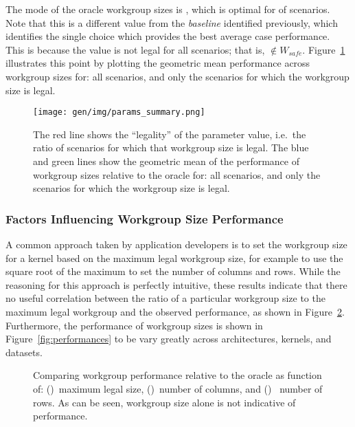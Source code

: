 The mode of the oracle workgroup sizes is
, which is optimal for
 of scenarios. Note that this is
a different value from the \emph{baseline} identified previously,
which identifies the single choice which provides the best average
case performance. This is because the value is not legal for all
scenarios; that is, $ \not\in W_{safe}$.
Figure~\ref{fig:performance-legality} illustrates this point by
plotting the geometric mean performance across workgroup sizes for:
all scenarios, and only the scenarios for which the workgroup size is
legal.

\begin{figure}
\centering
\texttt{[image: gen/img/params\_summary.png]}
\caption{%
  The red line shows the ``legality'' of the parameter value, i.e.\
  the ratio of scenarios for which that workgroup size is legal.  The
  blue and green lines show the geometric mean of the performance of
  workgroup sizes relative to the oracle for: all scenarios, and only
  the scenarios for which the workgroup size is legal.%
}
\label{fig:performance-legality}
\end{figure}


\subsubsection{Factors Influencing Workgroup Size Performance}

A common approach taken by application developers is to set the
workgroup size for a kernel based on the maximum legal workgroup size,
for example to use the square root of the maximum to set the number of
columns and rows. While the reasoning for this approach is perfectly
intuitive, these results indicate that there no useful correlation
between the ratio of a particular workgroup size to the maximum legal
workgroup and the observed performance, as shown in
Figure~\ref{fig:performance-wgsizes}. Furthermore, the performance of
workgroup sizes is shown in Figure~\ref{fig:performances} to be vary
greatly across architectures, kernels, and datasets.


\begin{figure}

\caption{%
  Comparing workgroup performance relative to the oracle as function
  of: (\subref{fig:performance-max-wgsize})~maximum legal size,
  ()~number of columns, and
  ()~ number of rows. As can be seen,
  workgroup size alone is not indicative of performance.%
}
\label{fig:performance-wgsizes}
\end{figure}

